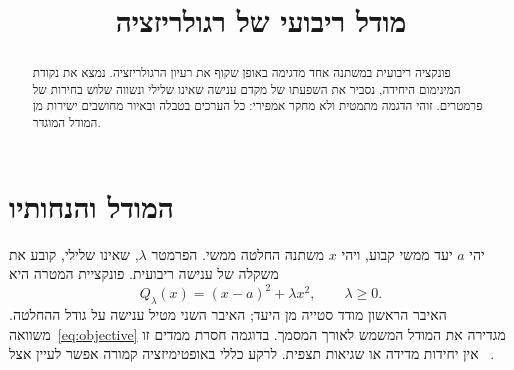 \def\lakitlanguageprofile{hebrew}
\def\lakitmainlanguage{hebrew}
\def\lakitdocumentclass{article}
\def\lakitclassoptions{11pt,a4paper}
\def\lakitgeometryoptions{margin=2.7cm,headheight=14pt}
\def\lakitlinespread{1.08}
\def\lakitsecnumdepth{2}
\def\lakitparagraphstyle{indented}



\title{מודל ריבועי של רגולריזציה}
\author{}
\date{}
\theoremstyle{definition}
\newtheorem{paperlemma}{למה}
\pagestyle{plain}

\maketitle
\begin{abstract}
פונקציה ריבועית במשתנה אחד מדגימה באופן שקוף את רעיון הרגולריזציה.
נמצא את נקודת המינימום היחידה, נסביר את השפעתו של מקדם ענישה שאינו שלילי
ונשווה שלוש בחירות של פרמטרים. זוהי הדגמה מתמטית ולא מחקר אמפירי:
כל הערכים בטבלה ובאיור מחושבים ישירות מן המודל המוגדר.
\end{abstract}
\section{המודל והנחותיו}
יהי $a$ יעד ממשי קבוע, ויהי $x$ משתנה החלטה ממשי. הפרמטר $\lambda$,
שאינו שלילי, קובע את משקלה של ענישה ריבועית. פונקציית המטרה היא
\begin{equation}\label{eq:objective}
Q_\lambda(x)=(x-a)^2+\lambda x^2,\qquad \lambda\geq 0.
\end{equation}
האיבר הראשון מודד סטייה מן היעד; האיבר השני מטיל ענישה על גודל ההחלטה.
משוואה~\eqref{eq:objective} מגדירה את המודל המשמש לאורך המסמך.
בדוגמה חסרת ממדים זו אין יחידות מדידה או שגיאות תצפית.
לרקע כללי באופטימיזציה קמורה אפשר לעיין אצל
~\cite{boyd2004}.
